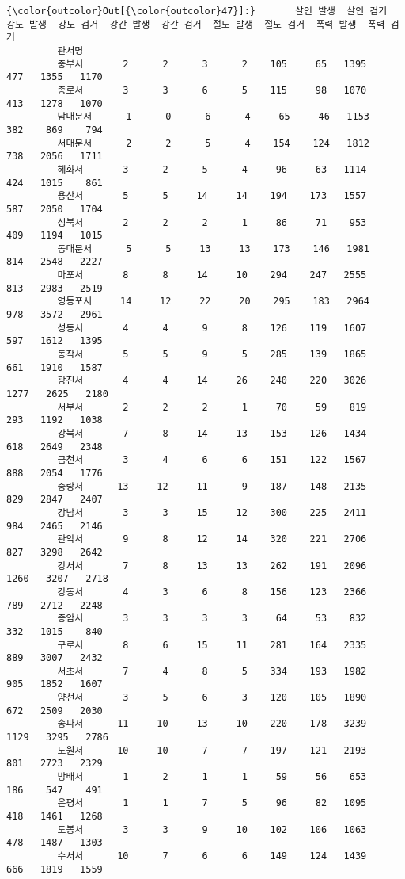\documentclass[11pt]{article}
\begin{document}
\begin{Verbatim}[commandchars=\\\{\}]
{\color{outcolor}Out[{\color{outcolor}47}]:}       살인 발생  살인 검거  강도 발생  강도 검거  강간 발생  강간 검거  절도 발생  절도 검거  폭력 발생  폭력 검거
         관서명                                                                       
         중부서       2      2      3      2    105     65   1395    477   1355   1170
         종로서       3      3      6      5    115     98   1070    413   1278   1070
         남대문서      1      0      6      4     65     46   1153    382    869    794
         서대문서      2      2      5      4    154    124   1812    738   2056   1711
         혜화서       3      2      5      4     96     63   1114    424   1015    861
         용산서       5      5     14     14    194    173   1557    587   2050   1704
         성북서       2      2      2      1     86     71    953    409   1194   1015
         동대문서      5      5     13     13    173    146   1981    814   2548   2227
         마포서       8      8     14     10    294    247   2555    813   2983   2519
         영등포서     14     12     22     20    295    183   2964    978   3572   2961
         성동서       4      4      9      8    126    119   1607    597   1612   1395
         동작서       5      5      9      5    285    139   1865    661   1910   1587
         광진서       4      4     14     26    240    220   3026   1277   2625   2180
         서부서       2      2      2      1     70     59    819    293   1192   1038
         강북서       7      8     14     13    153    126   1434    618   2649   2348
         금천서       3      4      6      6    151    122   1567    888   2054   1776
         중랑서      13     12     11      9    187    148   2135    829   2847   2407
         강남서       3      3     15     12    300    225   2411    984   2465   2146
         관악서       9      8     12     14    320    221   2706    827   3298   2642
         강서서       7      8     13     13    262    191   2096   1260   3207   2718
         강동서       4      3      6      8    156    123   2366    789   2712   2248
         종암서       3      3      3      3     64     53    832    332   1015    840
         구로서       8      6     15     11    281    164   2335    889   3007   2432
         서초서       7      4      8      5    334    193   1982    905   1852   1607
         양천서       3      5      6      3    120    105   1890    672   2509   2030
         송파서      11     10     13     10    220    178   3239   1129   3295   2786
         노원서      10     10      7      7    197    121   2193    801   2723   2329
         방배서       1      2      1      1     59     56    653    186    547    491
         은평서       1      1      7      5     96     82   1095    418   1461   1268
         도봉서       3      3      9     10    102    106   1063    478   1487   1303
         수서서      10      7      6      6    149    124   1439    666   1819   1559
\end{Verbatim}
            
\end{document}
